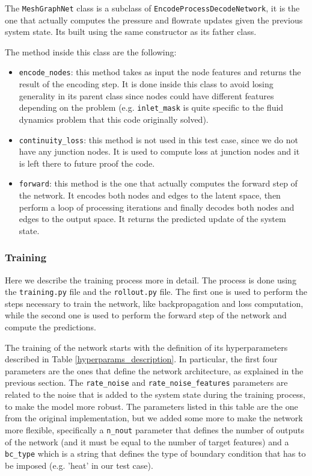\documentclass[11pt,a4paper]{article}
\begin{document}
The \texttt{MeshGraphNet} class is a subclass of \texttt{EncodeProcessDecodeNetwork}, it is the one that actually computes the pressure and flowrate updates given the previous system state. Its built using the same constructor as its father class. 

The method inside this class are the following:
\begin{itemize}
    \item \texttt{encode\_nodes}: this method takes as input the node features and returns the result of the encoding step. It is done inside this class to avoid losing generality in its parent class since nodes could have different features depending on the problem (e.g. \texttt{inlet\_mask} is quite specific to the fluid dynamics problem that this code originally solved).
    \item \texttt{continuity\_loss}: this method is not used in this test case, since we do not have any junction nodes. It is used to compute loss at junction nodes and it is left there to future proof the code.
    \item \texttt{forward}: this method is the one that actually computes the forward step of the network. It encodes both nodes and edges to the latent space, then perform a loop of processing iterations and finally decodes both nodes and edges to the output space. It returns the predicted update of the system state.
\end{itemize}

\subsubsection*{Training}

Here we describe the training process more in detail. The process is done using the \texttt{training.py} file and the \texttt{rollout.py} file. The first one is used to perform the steps necessary to train the network, like backpropagation and loss computation, while the second one is used to perform the forward step of the network and compute the predictions.

The training of the network starts with the definition of its hyperparameters described in Table \ref{hyperparams_description}. In particular, the first four parameters are the ones that define the network architecture, as explained in the previous section. The \texttt{rate\_noise} and \texttt{rate\_noise\_features} parameters are related to the noise that is added to the system state during the training process, to make the model more robust. The parameters listed in this table are the one from the original implementation, but we added some more to make the network more flexible, specifically a \texttt{n\_nout} parameter that defines the number of outputs of the network (and it must be equal to the number of target features) and a \texttt{bc\_type} which is a string that defines the type of boundary condition that has to be imposed (e.g. 'heat' in our test case).
\end{document}
